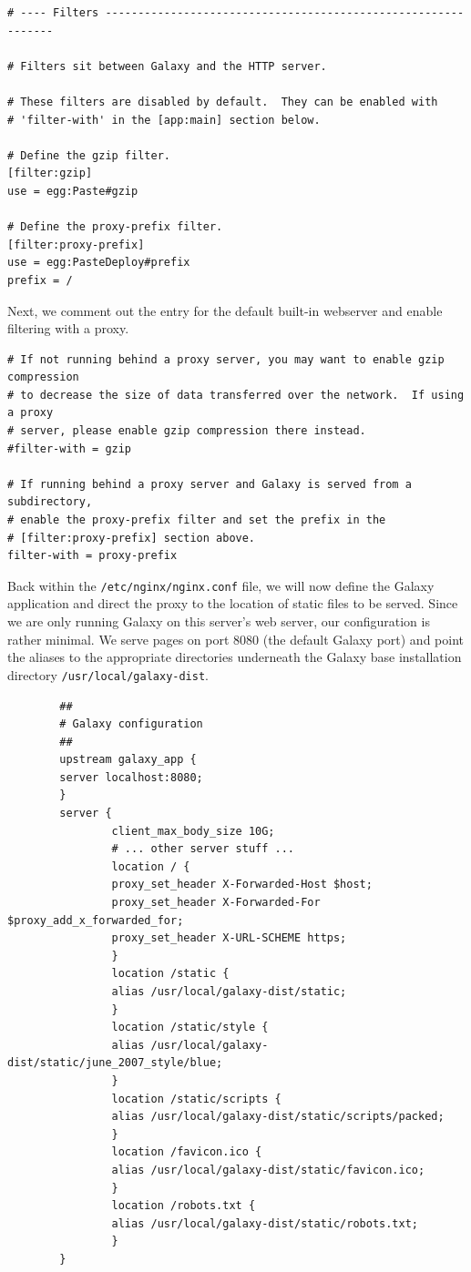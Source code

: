 \documentclass[a4paper,10pt]{article}
\begin{document}
\begin{lstlisting}
# ---- Filters --------------------------------------------------------------

# Filters sit between Galaxy and the HTTP server.

# These filters are disabled by default.  They can be enabled with
# 'filter-with' in the [app:main] section below.

# Define the gzip filter.
[filter:gzip]
use = egg:Paste#gzip

# Define the proxy-prefix filter.
[filter:proxy-prefix]
use = egg:PasteDeploy#prefix
prefix = /
\end{lstlisting}

Next, we comment out the entry for the default built-in webserver and enable filtering with a proxy.

\begin{lstlisting}
# If not running behind a proxy server, you may want to enable gzip compression
# to decrease the size of data transferred over the network.  If using a proxy
# server, please enable gzip compression there instead.
#filter-with = gzip

# If running behind a proxy server and Galaxy is served from a subdirectory,
# enable the proxy-prefix filter and set the prefix in the
# [filter:proxy-prefix] section above.
filter-with = proxy-prefix
\end{lstlisting}

Back within the \texttt{\footnotesize{/etc/nginx/nginx.conf}} file, we will now define the Galaxy application and direct the proxy to the location of static files to be served.
Since we are only running Galaxy on this server's web server, our configuration is rather minimal.  We serve pages on port 8080 (the default Galaxy port) and point the aliases to the appropriate directories underneath the Galaxy base installation directory \texttt{\footnotesize{/usr/local/galaxy-dist}}.

\begin{lstlisting}
        ##
        # Galaxy configuration
        ##
        upstream galaxy_app {
        server localhost:8080;
        }
        server {
                client_max_body_size 10G;
                # ... other server stuff ...
                location / {
                proxy_set_header X-Forwarded-Host $host;
                proxy_set_header X-Forwarded-For $proxy_add_x_forwarded_for;
                proxy_set_header X-URL-SCHEME https;
                }
                location /static {
                alias /usr/local/galaxy-dist/static;
                }
                location /static/style {
                alias /usr/local/galaxy-dist/static/june_2007_style/blue;
                }
                location /static/scripts {
                alias /usr/local/galaxy-dist/static/scripts/packed;
                }
                location /favicon.ico {
                alias /usr/local/galaxy-dist/static/favicon.ico;
                }
                location /robots.txt {
                alias /usr/local/galaxy-dist/static/robots.txt;
                }
        }
\end{lstlisting}
\end{document}
